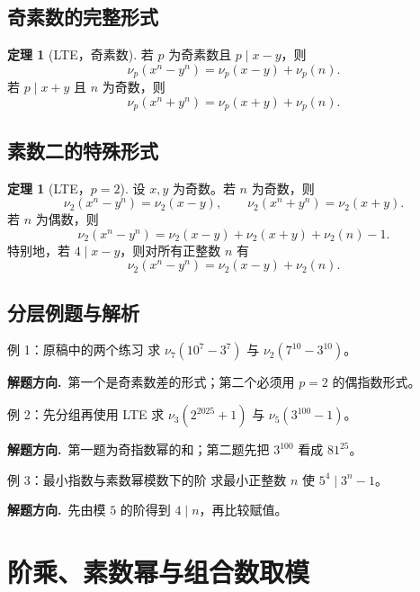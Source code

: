 \documentclass[UTF8,a4paper,11pt,oneside,openany,fontset=fandol]{ctexbook}
\theoremstyle{definition}
\newtheorem{theorem}[definition]{定理}
\newcommand{\hint}{\par\noindent\textbf{解题方向.}\ }
\begin{document}
\section{奇素数的完整形式}
\begin{theorem}[LTE，奇素数]
若 $p$ 为奇素数且 $p\mid x-y$，则
\[
 \nu_p(x^n-y^n)=\nu_p(x-y)+\nu_p(n).
\]
若 $p\mid x+y$ 且 $n$ 为奇数，则
\[
 \nu_p(x^n+y^n)=\nu_p(x+y)+\nu_p(n).
\]
\end{theorem}


\section{素数二的特殊形式}
\begin{theorem}[LTE，$p=2$]
设 $x,y$ 为奇数。若 $n$ 为奇数，则
\[
 \nu_2(x^n-y^n)=\nu_2(x-y),\qquad
 \nu_2(x^n+y^n)=\nu_2(x+y).
\]
若 $n$ 为偶数，则
\[
 \nu_2(x^n-y^n)=\nu_2(x-y)+\nu_2(x+y)+\nu_2(n)-1.
\]
特别地，若 $4\mid x-y$，则对所有正整数 $n$ 有
\[
 \nu_2(x^n-y^n)=\nu_2(x-y)+\nu_2(n).
\]
\end{theorem}


\section{分层例题与解析}
\begin{problem}{例 1：原稿中的两个练习}
求 $\nu_7(10^7-3^7)$ 与 $\nu_2(7^{10}-3^{10})$。
\end{problem}
\hint 第一个是奇素数差的形式；第二个必须用 $p=2$ 的偶指数形式。


\begin{problem}{例 2：先分组再使用 LTE}
求 $\nu_3(2^{2025}+1)$ 与 $\nu_5(3^{100}-1)$。
\end{problem}
\hint 第一题为奇指数幂的和；第二题先把 $3^{100}$ 看成 $81^{25}$。


\begin{problem}{例 3：最小指数与素数幂模数下的阶}
求最小正整数 $n$ 使 $5^4\mid3^n-1$。
\end{problem}
\hint 先由模 $5$ 的阶得到 $4\mid n$，再比较赋值。



\chapter{阶乘、素数幂与组合数取模}
\end{document}

